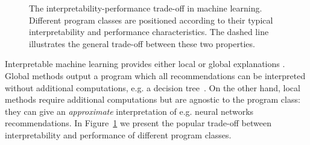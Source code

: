 \begin{figure}[htbp]
    \centering
    \caption{The interpretability-performance trade-off in machine learning. Different program classes are positioned according to their typical interpretability and performance characteristics. The dashed line illustrates the general trade-off between these two properties.}
    \label{fig:interpretability-performance-tradeoff}
\end{figure}
Interpretable machine learning provides either local or global explanations \cite{glanois-survey}.
Global methods output a program which all recommendations can be interpreted without additional computations, e.g. a decision tree~\cite{breiman1984classification}. On the other hand, local methods require additional computations but are agnostic to the program class: they can give an \textit{approximate} interpretation of e.g. neural networks recommendations.
In Figure~\ref{fig:interpretability-performance-tradeoff} we present the popular trade-off between interpretability and performance of different program classes.


